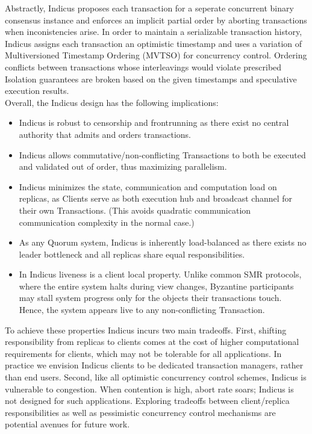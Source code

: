 Abstractly, Indicus proposes each transaction for a seperate concurrent binary consensus instance and enforces an implicit partial order by aborting transactions when inconistencies arise. In order to maintain a serializable transaction history, Indicus assigns each transaction an optimistic timestamp and uses a variation of Multiversioned Timestamp Ordering (MVTSO) for concurrency control. Ordering conflicts between transactions whose interleavings would violate prescribed Isolation guarantees are broken based on the given timestamps and speculative execution results. \\



Overall, the Indicus design has the following implications:
\begin{itemize}%

\item Indicus is robust to censorship and frontrunning as there exist no central authority that admits and orders transactions.
\item Indicus allows commutative/non-conflicting Transactions to both be executed and validated out of order, thus maximizing parallelism. 
\item Indicus minimizes the state, communication and computation load on replicas, as Clients serve as both execution hub and broadcast channel for their own Transactions. (This avoids quadratic communication communication complexity in the normal case.) 
\item As any Quorum system, Indicus is inherently load-balanced as there exists no leader bottleneck and all replicas share equal responsibilities.
\item In Indicus liveness is a client local property. Unlike common SMR protocols, where the entire system halts during view changes, Byzantine participants may stall system progress only for the objects their transactions touch. Hence, the system appears live to any non-conflicting Transaction.
\end{itemize}

To achieve these properties Indicus incurs two main tradeoffs. First, shifting responsibility from replicas to clients comes at the cost of higher computational requirements for clients, which may not be tolerable for all applications. In practice we envision Indicus clients to be dedicated transaction managers, rather than end users. Second, like all optimistic concurrency control schemes, Indicus is vulnerable to congestion. When contention is high, abort rate soars; Indicus is not designed for such applications. Exploring tradeoffs between client/replica responsibilities as well as pessimistic concurrency control mechanisms are potential avenues for future work.

